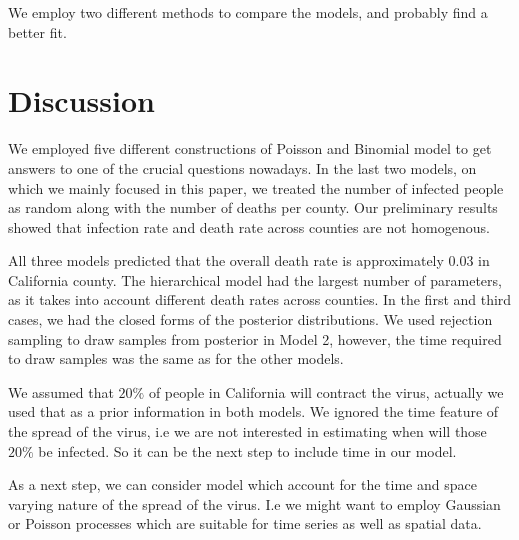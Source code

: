 \documentclass[11pt,twocolumn]{asaproc}
\begin{document}
We employ two different methods to compare the models, and probably find a better fit. 
























\section{Discussion} %

We employed five different constructions of Poisson and Binomial model to get answers to one of the crucial questions nowadays. In the last two models, on which we mainly focused in this paper, we treated the number of infected people as random along with the number of deaths per county. Our preliminary results showed that infection rate and death rate across counties are not homogenous. %

All three models predicted that the overall death rate is approximately 0.03 in California county. The hierarchical model had the largest number of parameters, as it takes into account different death rates across counties. In the first and third cases, we had the closed forms of the posterior distributions. We used rejection sampling to draw samples from posterior in Model 2, however, the time required to draw samples was the same as for the other models. 

We assumed that $20\%$ of people in California will contract the virus, actually we used that as a prior information in both models. We ignored the time feature of the spread of the virus, i.e we are not interested in estimating when will those $20\%$ be infected. So it can be the next step to include time in our model. 

As a next step, we can consider model which account for the time and space varying nature of the spread of the virus. I.e we might want to employ Gaussian or Poisson processes which are suitable for time series as well as spatial data. 
\end{document}
